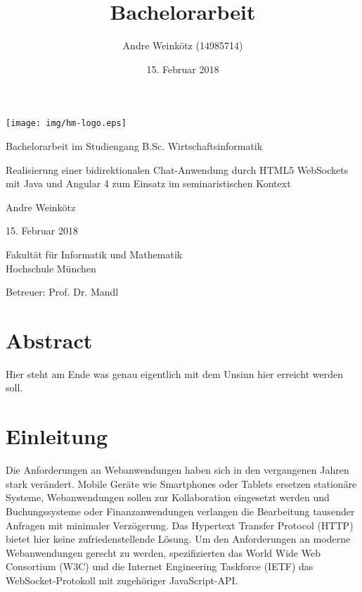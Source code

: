\documentclass[11pt,a4paper,titlepage]{scrartcl}
\title{Bachelorarbeit}
\author{Andre Weinkötz (14985714)}
\date{15. Februar 2018}
\numberwithin{equation}{section}
\begin{document}
  \pagestyle{empty}

  \begin{titlepage}

\begin{center}
	\texttt{[image: img/hm-logo.eps]}
\end{center}
 \bigskip

 \begin{center} \large 
    
    Bachelorarbeit im Studiengang B.Sc. Wirtschaftsinformatik
    \vspace*{2.5cm}
\end{center}
\begin{center}
	    {\huge Realisierung einer bidirektionalen Chat-Anwendung durch HTML5 WebSockets mit Java und Angular 4 zum Einsatz im seminaristischen Kontext}
\end{center}

    
    \vspace*{2.0cm}
 \begin{center}
    Andre Weinkötz \bigskip
    
    

    15. Februar 2018
    \vspace*{2.5cm}
    
    

    Fakultät für Informatik und Mathematik \\
	Hochschule München\bigskip
	
	Betreuer: Prof. Dr. Mandl 
	
	
  \end{center}
\end{titlepage}

\newpage
\section*{Abstract}
Hier steht am Ende was genau eigentlich mit dem Unsinn hier erreicht werden soll.
\newpage
 \tableofcontents

\newpage
  \pagestyle{headings}

\section{Einleitung}\label{sec:Einleitung}
Die Anforderungen an Webanwendungen haben sich in den vergangenen Jahren stark verändert. Mobile Geräte wie Smartphones oder Tablets ersetzen stationäre Systeme, Webanwendungen sollen zur Kollaboration eingesetzt werden und Buchungssysteme oder Finanzanwendungen verlangen die Bearbeitung tausender Anfragen mit minimaler Verzögerung. Das Hypertext Transfer Protocol (HTTP) bietet hier keine zufriedenstellende Lösung. Um den Anforderungen an moderne Webanwendungen gerecht zu werden, spezifizierten das World Wide Web Consortium (W3C) und die Internet Engineering Taskforce (IETF) das WebSocket-Protokoll mit zugehöriger JavaScript-API. \\
\end{document}
